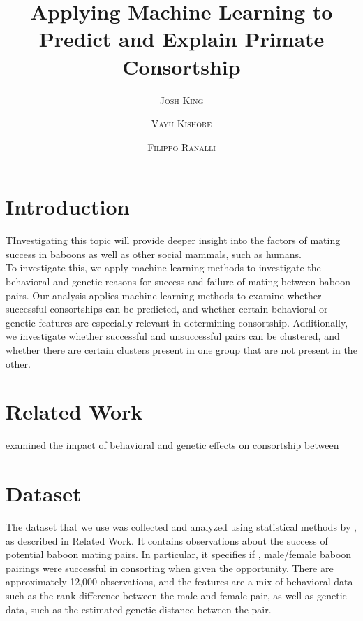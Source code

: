 \documentclass[twoside,twocolumn,paper=letter]{article}
\title{Applying Machine Learning to Predict and Explain Primate Consortship} %
\author{%
\textsc{Josh King} \\[1ex] 
\and 
\textsc{Vayu Kishore} \\[1ex] 
\and 
\textsc{Filippo Ranalli} \\[1ex] 
}
\date{} %
\begin{document}
\maketitle


\section{Introduction}

\lettrine[nindent=0em,lines=3]{T}
Investigating this topic will provide deeper insight into the factors of
mating success in baboons as well as other social mammals, such as humans.\\

To investigate this, we apply machine learning methods to investigate the
behavioral and genetic reasons for success and failure of mating between baboon
pairs. Our analysis applies machine learning methods to examine whether
successful consortships can be predicted, and whether certain behavioral or genetic
features are especially relevant in determining consortship. Additionally, we
investigate whether successful and unsuccessful pairs can be clustered, and
whether there are certain clusters present in one group that are not present in
the other.


\section{Related Work}
\cite{Tung:2012} examined the impact of behavioral and genetic effects on
consortship between 
\section{Dataset}
The dataset that we use was collected and analyzed using statistical methods by
\cite{Tung:2012}, as described in Related Work. It contains observations about
the success of potential baboon mating pairs. In particular, it specifies if ,
male/female baboon pairings were successful in consorting when given the
opportunity.  There are approximately 12,000 observations, and the features are
a mix of behavioral data such as the rank difference between the male and female
pair, as well as genetic data, such as the estimated genetic distance between
the pair. 
\end{document}
